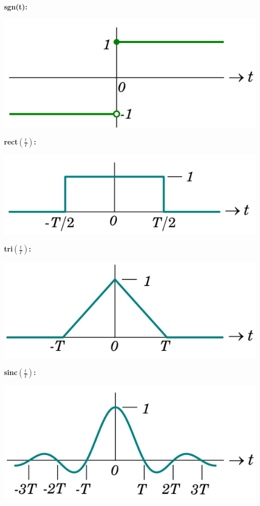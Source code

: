 \documentclass[6pt,landscape,a4paper]{extarticle}
\newenvironment{Figure}
  {\par\medskip\noindent\minipage{\linewidth}}
  {\endminipage\par\medskip}
\begin{document}
\begin{multicols*}{5}
\begin{Figure}
    \end{Figure}
    \textbf{sgn(t):}
    \begin{Figure}
        \centering
        \includegraphics[width=0.8\linewidth]{images/signum.png}
    \end{Figure}
    \textbf{rect$\left( \frac{t}{T}\right)$:}
    \begin{Figure}
        \centering
        \includegraphics[width=0.8\linewidth]{images/rect.png}
    \end{Figure}
    \textbf{tri$\left( \frac{t}{T}\right)$:}
    \begin{Figure}
        \centering
        \includegraphics[width=0.8\linewidth]{images/tri.png}
    \end{Figure}
    \textbf{sinc$\left(\frac{t}{T}\right)$:}
    \begin{Figure}
        \centering
        \includegraphics[width=0.8\linewidth]{images/sinc.png}

\end{Figure}
\end{multicols*}
\end{document}
